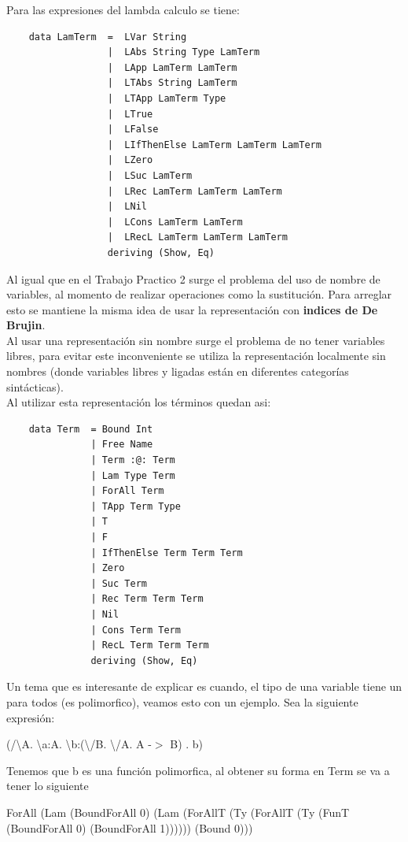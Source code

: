 \documentclass[12pt, titlepage, a4paper]{article}
\begin{document}
\noindent Para las expresiones del lambda calculo se tiene:
\begin{verbatim}
    data LamTerm  =  LVar String
                  |  LAbs String Type LamTerm
                  |  LApp LamTerm LamTerm
                  |  LTAbs String LamTerm
                  |  LTApp LamTerm Type
                  |  LTrue 
                  |  LFalse
                  |  LIfThenElse LamTerm LamTerm LamTerm
                  |  LZero
                  |  LSuc LamTerm
                  |  LRec LamTerm LamTerm LamTerm
                  |  LNil
                  |  LCons LamTerm LamTerm
                  |  LRecL LamTerm LamTerm LamTerm
                  deriving (Show, Eq)
\end{verbatim}

Al igual que en el Trabajo Practico 2 \cite{tp2:lambdaCalculoSimpleTipado} surge el problema del uso de nombre de variables, al 
momento de realizar operaciones como la sustitución. Para arreglar esto se mantiene la misma idea de 
usar la representación con \textbf{indices de De Brujin}. \\

Al usar una representación sin nombre surge el problema de no tener variables libres,  
para evitar este inconveniente se utiliza la representación localmente sin nombres (donde variables libres y ligadas están 
en diferentes categorías sintácticas). \\

\noindent Al utilizar esta representación los términos quedan asi:
\begin{verbatim}
    data Term  = Bound Int
               | Free Name 
               | Term :@: Term
               | Lam Type Term
               | ForAll Term
               | TApp Term Type
               | T
               | F
               | IfThenElse Term Term Term
               | Zero
               | Suc Term
               | Rec Term Term Term
               | Nil
               | Cons Term Term
               | RecL Term Term Term
               deriving (Show, Eq)
\end{verbatim}


Un tema que es interesante de explicar es cuando, el tipo de una variable tiene un para todos (es polimorfico), veamos esto con un ejemplo. 
Sea la siguiente expresión:
\begin{center}
  (/\textbackslash A. \textbackslash a:A. \textbackslash b:(\textbackslash/B. \textbackslash/A. A -$>$ B) . b) 
\end{center}
Tenemos que b es una función polimorfica, al obtener su forma en Term se va a tener lo siguiente
\begin{center}
  ForAll (Lam (BoundForAll 0) (Lam (ForAllT (Ty (ForAllT (Ty (FunT (BoundForAll 0) (BoundForAll 1)))))) (Bound 0)))
\end{center}
\end{document}
